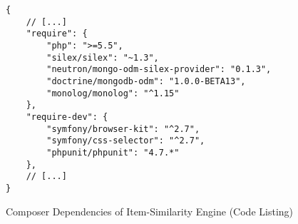 \begin{figure}[!ht]
    \begin{verbatim}
{
    // [...]
    "require": {
        "php": ">=5.5",
        "silex/silex": "~1.3",
        "neutron/mongo-odm-silex-provider": "0.1.3",
        "doctrine/mongodb-odm": "1.0.0-BETA13",
        "monolog/monolog": "^1.15"
    },
    "require-dev": {
        "symfony/browser-kit": "^2.7",
        "symfony/css-selector": "^2.7",
        "phpunit/phpunit": "4.7.*"
    },
    // [...]
}
    \end{verbatim}
    \caption{Composer Dependencies of Item-Similarity Engine (Code Listing)}
    \label{fig:implementation-provisioning-dependency}
\end{figure}